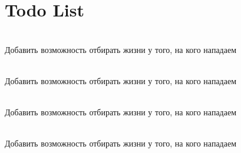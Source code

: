 \chapter{Todo List }
\hypertarget{todo}{}\label{todo}

\begin{DoxyRefList}
\item[{\parbox[t]{\linewidth}{Member \doxylink{class_archer_ad5a62a929801de20b6c53858b8a77256}{Archer::\+attack} () override}}]\hfill \\
\label{todo__todo000003}%
%
Добавить возможность отбирать жизни у того, на кого нападаем  
\item[{\parbox[t]{\linewidth}{Member \doxylink{class_knight_ade9dd3a7d4b27a59b59f8cb123ecc4f4}{Knight::\+attack} () override}}]\hfill \\
\label{todo__todo000004}%
%
Добавить возможность отбирать жизни у того, на кого нападаем  
\item[{\parbox[t]{\linewidth}{Member \doxylink{class_mage_a5ac36b45df55997e4fa1f50ff571b7d1}{Mage::\+attack} () override}}]\hfill \\
\label{todo__todo000002}%
%
Добавить возможность отбирать жизни у того, на кого нападаем  
\item[{\parbox[t]{\linewidth}{Member \doxylink{class_warrior_a0d8d9631bffe5aee5e9420acc544c190}{Warrior::\+attack} () override}}]\hfill \\
\label{todo__todo000001}%
%
Добавить возможность отбирать жизни у того, на кого нападаем 
\end{DoxyRefList}